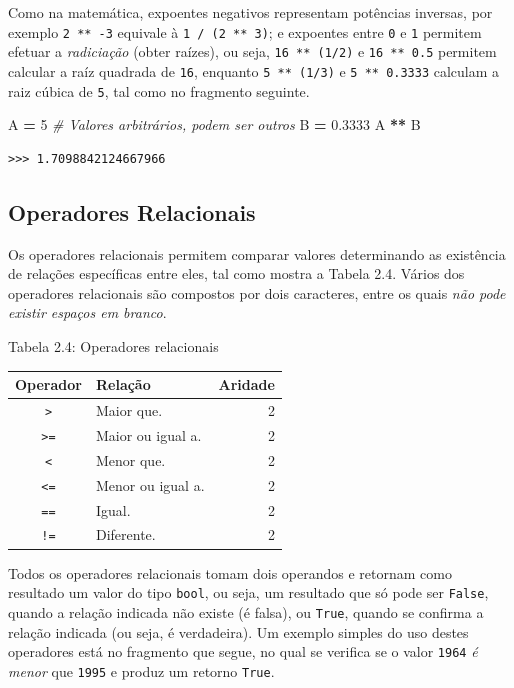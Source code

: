 \documentclass[
]{book}
\newenvironment{Shaded}{\begin{snugshade}}{\end{snugshade}}
\newcommand{\CommentTok}[1]{\textcolor[rgb]{0.56,0.35,0.01}{\textit{#1}}}
\newcommand{\DecValTok}[1]{\textcolor[rgb]{0.00,0.00,0.81}{#1}}
\newcommand{\FloatTok}[1]{\textcolor[rgb]{0.00,0.00,0.81}{#1}}
\newcommand{\NormalTok}[1]{#1}
\newcommand{\OperatorTok}[1]{\textcolor[rgb]{0.81,0.36,0.00}{\textbf{#1}}}
\begin{document}
Como na matemática, expoentes negativos representam potências inversas, por exemplo \texttt{2\ **\ -3} equivale à \texttt{1\ /\ (2\ **\ 3)}; e expoentes entre \texttt{0} e \texttt{1} permitem efetuar a \emph{radiciação} (obter raízes), ou seja, \texttt{16\ **\ (1/2)} e \texttt{16\ **\ 0.5} permitem calcular a raíz quadrada de \texttt{16}, enquanto \texttt{5\ **\ (1/3)} e \texttt{5\ **\ 0.3333} calculam a raiz cúbica de \texttt{5}, tal como no fragmento seguinte.

\begin{Shaded}
\begin{Highlighting}[]
\NormalTok{A }\OperatorTok{=} \DecValTok{5} \CommentTok{\# Valores arbitrários, podem ser outros}
\NormalTok{B }\OperatorTok{=} \FloatTok{0.3333}
\NormalTok{A }\OperatorTok{**}\NormalTok{ B}
\end{Highlighting}
\end{Shaded}

\begin{verbatim}
>>> 1.7098842124667966
\end{verbatim}

\hypertarget{comput-opera-relac}{%
\subsection{Operadores Relacionais}\label{comput-opera-relac}}

Os operadores relacionais permitem comparar valores determinando as existência de relações específicas entre eles, tal como mostra a Tabela 2.4. Vários dos operadores relacionais são compostos por dois caracteres, entre os quais \emph{não pode existir espaços em branco}.

Tabela 2.4: Operadores relacionais

\begin{longtable}[]{@{}clr@{}}
\toprule
Operador & Relação & Aridade \\
\midrule
\endhead
\texttt{\textgreater{}} & Maior que. & 2 \\
\texttt{\textgreater{}=} & Maior ou igual a. & 2 \\
\texttt{\textless{}} & Menor que. & 2 \\
\texttt{\textless{}=} & Menor ou igual a. & 2 \\
\texttt{==} & Igual. & 2 \\
\texttt{!=} & Diferente. & 2 \\
\bottomrule
\end{longtable}

Todos os operadores relacionais tomam dois operandos e retornam como resultado um valor do tipo \texttt{bool}, ou seja, um resultado que só pode ser \texttt{False}, quando a relação indicada não existe (é falsa), ou \texttt{True}, quando se confirma a relação indicada (ou seja, é verdadeira). Um exemplo simples do uso destes operadores está no fragmento que segue, no qual se verifica se o valor \texttt{1964} \emph{é menor} que \texttt{1995} e produz um retorno \texttt{True}.
\end{document}
